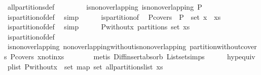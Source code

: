 \begin{isabellebody}
\ all{\isacharunderscore}partitions{\isacharunderscore}def\ \isacommand{{\isachardot}{\isachardot}}\isamarkupfalse%
\isanewline
\ \ \ \ \isamarkupfalse%
\ \isamarkupfalse%
\ is{\isacharunderscore}non{\isacharunderscore}overlapping{\isacharcolon}\ {\isachardoublequoteopen}is{\isacharunderscore}non{\isacharunderscore}overlapping\ P{\isachardoublequoteclose}\ \isamarkupfalse%
\ is{\isacharunderscore}partition{\isacharunderscore}of{\isacharunderscore}def\ \isamarkupfalse%
\ simp\isanewline
\ \ \ \ \isamarkupfalse%
\ is{\isacharunderscore}partition{\isacharunderscore}of\ \isamarkupfalse%
\ P{\isacharunderscore}covers{\isacharcolon}\ {\isachardoublequoteopen}{\isasymUnion}\ P\ {\isacharequal}\ set\ {\isacharparenleft}x\ {\isacharhash}\ xs{\isacharparenright}{\isachardoublequoteclose}\ \isamarkupfalse%
\ is{\isacharunderscore}partition{\isacharunderscore}of{\isacharunderscore}def\ \isamarkupfalse%
\ simp\isanewline
\isanewline
\ \ \ \ \isamarkupfalse%
\ {\isachardoublequoteopen}{\isacharquery}P{\isacharunderscore}without{\isacharunderscore}x\ partitions\ {\isacharparenleft}set\ xs{\isacharparenright}{\isachardoublequoteclose}\isanewline
\ \ \ \ \ \ \isamarkupfalse%
\ is{\isacharunderscore}partition{\isacharunderscore}of{\isacharunderscore}def\isanewline
\ \ \ \ \ \ \isamarkupfalse%
\ is{\isacharunderscore}non{\isacharunderscore}overlapping\ non{\isacharunderscore}overlapping{\isacharunderscore}without{\isacharunderscore}is{\isacharunderscore}non{\isacharunderscore}overlapping\ partition{\isacharunderscore}without{\isacharunderscore}covers\ P{\isacharunderscore}covers\ x{\isacharunderscore}notin{\isacharunderscore}xs\isanewline
\ \ \ \ \ \ \isamarkupfalse%
\ {\isacharparenleft}metis\ Diff{\isacharunderscore}insert{\isacharunderscore}absorb\ List{\isachardot}set{\isacharunderscore}simps{\isacharparenleft}{}{\isacharparenright}{\isacharparenright}\isanewline
\ \ \ \ \isamarkupfalse%
\ hyp{\isacharunderscore}equiv\ \isamarkupfalse%
\ p{\isacharunderscore}list{\isacharcolon}\ {\isachardoublequoteopen}{\isacharquery}P{\isacharunderscore}without{\isacharunderscore}x\ {\isasymin}\ set\ {\isacharparenleft}map\ set\ {\isacharparenleft}all{\isacharunderscore}partitions{\isacharunderscore}list\ xs{\isacharparenright}{\isacharparenright}{\isachardoublequoteclose}\isanewline
\ \ \ \ \ \ \isamarkupfalse%

\end{isabellebody}
